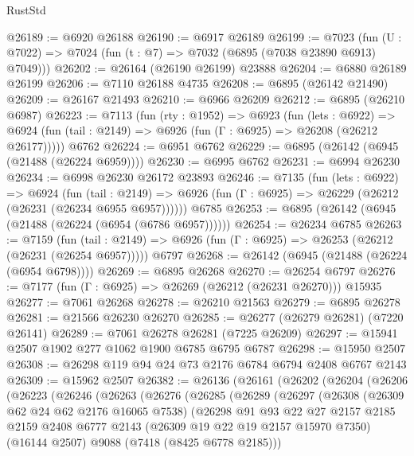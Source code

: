 \begin{lexlean}{RustStd}
\begin{coremodule}
@26189 := @6920 @26188
@26190 := @6917 @26189
@26199 := @7023
    (fun (U : @7022) => @7024 (fun (t : @7) => @7032 (@6895 (@7038 @23890 @6913) @7049)))
@26202 := @26164 (@26190 @26199) @23888
@26204 := @6880 @26189 @26199
@26206 := @7110 @26188 @4735
@26208 := @6895 (@26142 @21490)
@26209 := @26167 @21493
@26210 := @6966 @26209
@26212 := @6895 (@26210 @6987)
@26223 := @7113
    (fun (rty : @1952) =>
    @6923
      (fun (lets : @6922) =>
      @6924 (fun (tail : @2149) => @6926 (fun (Γ : @6925) => @26208 (@26212 @26177)))))
    @6762
@26224 := @6951 @6762
@26229 := @6895 (@26142 (@6945 (@21488 (@26224 @6959))))
@26230 := @6995 @6762
@26231 := @6994 @26230
@26234 := @6998 @26230 @26172 @23893
@26246 := @7135
    (fun (lets : @6922) =>
    @6924
      (fun (tail : @2149) =>
      @6926 (fun (Γ : @6925) => @26229 (@26212 (@26231 (@26234 @6955 @6957))))))
    @6785
@26253 := @6895 (@26142 (@6945 (@21488 (@26224 (@6954 (@6786 @6957))))))
@26254 := @26234 @6785
@26263 := @7159
    (fun (tail : @2149) => @6926 (fun (Γ : @6925) => @26253 (@26212 (@26231 (@26254 @6957)))))
    @6797
@26268 := @26142 (@6945 (@21488 (@26224 (@6954 @6798))))
@26269 := @6895 @26268
@26270 := @26254 @6797
@26276 := @7177 (fun (Γ : @6925) => @26269 (@26212 (@26231 @26270))) @15935
@26277 := @7061 @26268
@26278 := @26210 @21563
@26279 := @6895 @26278
@26281 := @21566 @26230 @26270
@26285 := @26277 (@26279 @26281) (@7220 @26141)
@26289 := @7061 @26278 @26281 (@7225 @26209)
@26297 := @15941 @2507 @1902 @277 @1062 @1900 @6785 @6795 @6787
@26298 := @15950 @2507
@26308 := @26298 @119 @94 @24 @73 @2176 @6784 @6794 @2408 @6767 @2143
@26309 := @15962 @2507
@26382 := @26136
    (@26161
      (@26202
        (@26204
          (@26206
            (@26223
              (@26246
                (@26263
                  (@26276
                    (@26285
                      (@26289
                        (@26297
                          (@26308
                            (@26309 @62 @24 @62 @2176 @16065 @7538)
                            (@26298
                              @91
                              @93
                              @22
                              @27
                              @2157
                              @2185
                              @2159
                              @2408
                              @6777
                              @2143
                              (@26309 @19 @22 @19 @2157 @15970 @7350)
                              (@16144 @2507)
                              @9088
                              (@7418 (@8425 @6778 @2185)))

\end{coremodule}
\end{lexlean}
